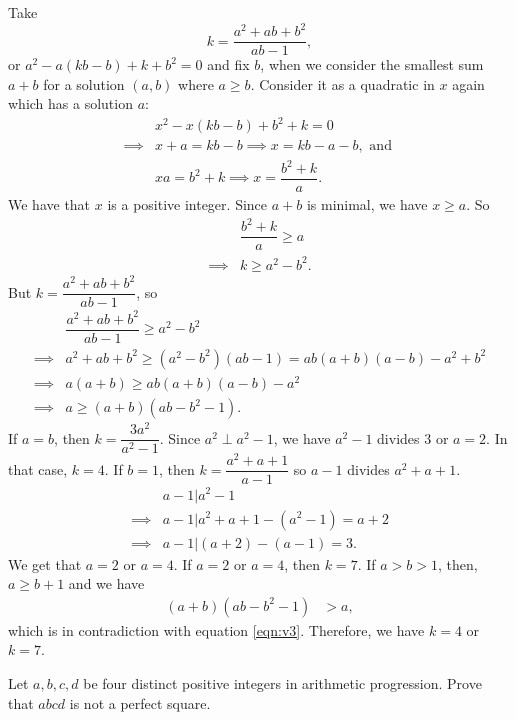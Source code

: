 \documentclass{subfile}
\begin{document}
	\begin{solution}
		Take \[k=\dfrac{a^2+ab+b^2}{ab-1},\] or $a^2-a(kb-b)+k+b^2=0$ and fix $b$, when we consider the smallest sum $a+b$ for a solution $(a,b)$ where $a\geq b$. Consider it as a quadratic in $x$ again which has a solution $a$:
			\begin{align*}
				& x^2-x(kb-b)+b^2+k = 0\\
				\implies & x+a = kb-b \implies x = kb-a-b, \text{ and }\\
				 & xa =b^2+k \implies x = \dfrac{b^2+k}{a}.
			\end{align*}
		We have that $x$ is a positive integer. Since $a+b$ is minimal, we have $x\geq a$. So
			\begin{align*}
				& \dfrac{b^2+k}{a} \geq a\\
				\implies &  k \geq a^2-b^2.
			\end{align*}
		But $k=\dfrac{a^2+ab+b^2}{ab-1}$, so
			\begin{align}
				& \dfrac{a^2+ab+b^2}{ab-1} \geq a^2-b^2\nonumber\\
				\implies & a^2+ab+b^2  \geq (a^2-b^2)(ab-1)= ab(a+b)(a-b)-a^2+b^2\nonumber\\
				\implies & a(a+b)  \geq ab(a+b)(a-b)-a^2\nonumber\\
				\implies & a  \geq (a+b)(ab-b^2-1).\label{eqn:v3}
			\end{align}
		If $a=b$, then $k=\dfrac{3a^2}{a^2-1}$. Since $a^2\perp a^2-1$, we have $a^2-1$ divides $3$ or $a=2$. In that case, $k=4$. If $b=1$, then $k=\dfrac{a^2+a+1}{a-1}$ so $a-1$ divides $a^2+a+1$.
			\begin{align*}
				& a-1 | a^2-1\\
				\implies & a-1 |a^2+a+1-(a^2-1) =a+2\\
				\implies & a-1 | (a+2)-(a-1)=3.
			\end{align*}
		We get that $a=2$ or $a=4$. If $a=2$ or $a=4$, then $k=7$. If $a>b>1$, then, $a\geq b+1$ and we have
			\begin{align*}
				(a+b)(ab-b^2-1) & > a,
			\end{align*}
		which is in contradiction with equation \eqref{eqn:v3}. Therefore, we have $k=4$ or $k=7$.
	\end{solution}

	\begin{problem}
		Let $ a,b,c,d$ be four distinct positive integers in arithmetic progression. Prove that $ abcd$ is not a perfect square.	
	\end{problem}
	
\end{document}
